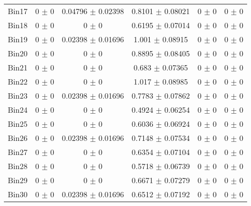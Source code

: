 \begin{tabular}{@{\extracolsep{4pt}}lccccc@{}}
     Bin17 & 0 $\pm$ 0 & 0.04796 $\pm$ 0.02398 & 0.8101 $\pm$ 0.08021 & 0 $\pm$ 0 & 0 $\pm$ 0 \\ 
     Bin18 & 0 $\pm$ 0 & 0 $\pm$ 0 & 0.6195 $\pm$ 0.07014 & 0 $\pm$ 0 & 0 $\pm$ 0 \\ 
     Bin19 & 0 $\pm$ 0 & 0.02398 $\pm$ 0.01696 & 1.001 $\pm$ 0.08915 & 0 $\pm$ 0 & 0 $\pm$ 0 \\ 
     Bin20 & 0 $\pm$ 0 & 0 $\pm$ 0 & 0.8895 $\pm$ 0.08405 & 0 $\pm$ 0 & 0 $\pm$ 0 \\ 
     Bin21 & 0 $\pm$ 0 & 0 $\pm$ 0 & 0.683 $\pm$ 0.07365 & 0 $\pm$ 0 & 0 $\pm$ 0 \\ 
     Bin22 & 0 $\pm$ 0 & 0 $\pm$ 0 & 1.017 $\pm$ 0.08985 & 0 $\pm$ 0 & 0 $\pm$ 0 \\ 
     Bin23 & 0 $\pm$ 0 & 0.02398 $\pm$ 0.01696 & 0.7783 $\pm$ 0.07862 & 0 $\pm$ 0 & 0 $\pm$ 0 \\ 
     Bin24 & 0 $\pm$ 0 & 0 $\pm$ 0 & 0.4924 $\pm$ 0.06254 & 0 $\pm$ 0 & 0 $\pm$ 0 \\ 
     Bin25 & 0 $\pm$ 0 & 0 $\pm$ 0 & 0.6036 $\pm$ 0.06924 & 0 $\pm$ 0 & 0 $\pm$ 0 \\ 
     Bin26 & 0 $\pm$ 0 & 0.02398 $\pm$ 0.01696 & 0.7148 $\pm$ 0.07534 & 0 $\pm$ 0 & 0 $\pm$ 0 \\ 
     Bin27 & 0 $\pm$ 0 & 0 $\pm$ 0 & 0.6354 $\pm$ 0.07104 & 0 $\pm$ 0 & 0 $\pm$ 0 \\ 
     Bin28 & 0 $\pm$ 0 & 0 $\pm$ 0 & 0.5718 $\pm$ 0.06739 & 0 $\pm$ 0 & 0 $\pm$ 0 \\ 
     Bin29 & 0 $\pm$ 0 & 0 $\pm$ 0 & 0.6671 $\pm$ 0.07279 & 0 $\pm$ 0 & 0 $\pm$ 0 \\ 
     Bin30 & 0 $\pm$ 0 & 0.02398 $\pm$ 0.01696 & 0.6512 $\pm$ 0.07192 & 0 $\pm$ 0 & 0 $\pm$ 0 \\ 
\hline\hline
  \end{tabular}
